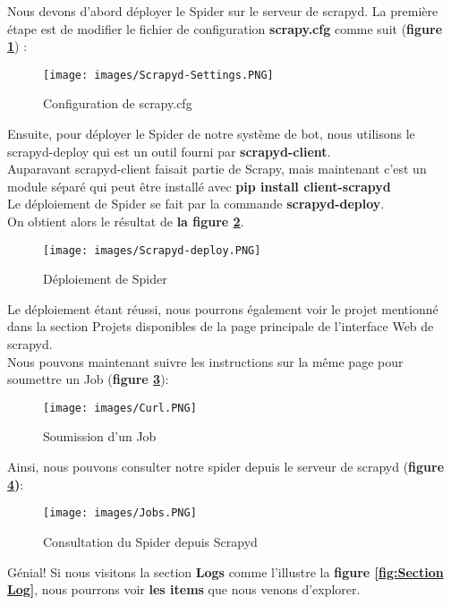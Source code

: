 Nous devons d'abord déployer le Spider sur le serveur de scrapyd. La première étape est de modifier le fichier de configuration \textbf{scrapy.cfg} comme suit (\textbf{figure \ref{fig:Scrapyd's settings}}) :
\begin{figure}[H]
            \centering
            \texttt{[image: images/Scrapyd-Settings.PNG]}
            \caption{Configuration de scrapy.cfg}
            \label{fig:Scrapyd's settings}  
        \end{figure}
Ensuite, pour déployer le Spider de notre système de bot, nous utilisons le scrapyd-deploy qui est un outil fourni par \textbf{scrapyd-client}. \\Auparavant scrapyd-client faisait partie de Scrapy, mais maintenant c'est un module séparé qui peut être installé avec \textbf{pip install client-scrapyd}  \\
Le déploiement de Spider se fait par la commande \textbf{scrapyd-deploy}. \\On obtient alors le résultat de \textbf{la figure \ref{fig:déploiement de Spider}}.
\begin{figure}[H]
            \centering
            \texttt{[image: images/Scrapyd-deploy.PNG]}
            \caption{Déploiement de Spider}
            \label{fig:déploiement de Spider}  
        \end{figure}
Le déploiement étant réussi, nous pourrons également voir le projet mentionné dans la section Projets disponibles de la page principale de l'interface Web de scrapyd.\\
Nous pouvons maintenant suivre les instructions sur la même page pour soumettre un Job (\textbf{figure \ref{fig:Soumettre un Job}}):
\begin{figure}[H]
            \centering
            \texttt{[image: images/Curl.PNG]}
            \caption{Soumission d'un Job}
            \label{fig:Soumettre un Job}  
        \end{figure}
\newpage
\noindent Ainsi, nous pouvons consulter notre spider depuis le serveur de scrapyd (\textbf{figure \ref{fig:consulter})}:
\begin{figure}[H]
            \centering
            \texttt{[image: images/Jobs.PNG]}
            \caption{Consultation du  Spider depuis Scrapyd}
            \label{fig:consulter}  
        \end{figure}
\noindent Génial! Si nous visitons la section \textbf{Logs} comme l'illustre la \textbf{figure \ref{fig:Section Log}}, nous pourrons voir \textbf{les items} que nous venons d'explorer. 
